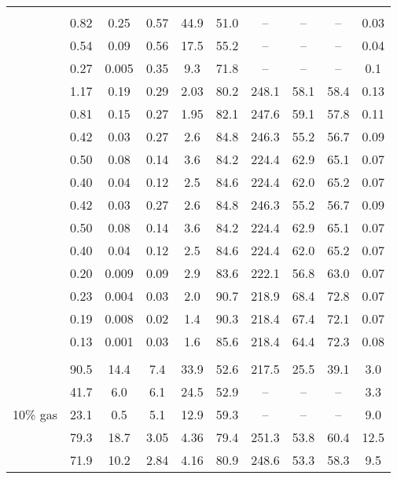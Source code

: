 \documentclass{article}
\begin{document}
\begin{landscape}
\begin{longtable}{cccccccccc}
\hline\hline\\[-4.0ex] 
\endlastfoot
\multirow{15}{*}{\begin{sideways}{\Large{1\% gas}}\end{sideways}}
& 0.82   &  0.25   & 0.57 & 44.9 & 51.0 & --     &  --  & -- & 0.03\\
& 0.54   &  0.09   & 0.56 & 17.5 & 55.2 & --     &  --  & -- & 0.04\\
& 0.27   &  0.005  & 0.35 & 9.3  & 71.8 & --     &  --  & -- & 0.1\\
& 1.17   &  0.19   & 0.29 & 2.03 & 80.2 & 248.1  & 58.1 & 58.4 & 0.13\\
& 0.81   &  0.15   & 0.27 & 1.95 & 82.1 & 247.6  & 59.1 & 57.8 & 0.11\\
& 0.42   &  0.03   & 0.27 & 2.6  & 84.8 & 246.3  & 55.2 & 56.7 & 0.09\\
& 0.50   &  0.08   & 0.14 & 3.6  & 84.2 & 224.4  & 62.9 & 65.1 & 0.07\\
& 0.40   &  0.04   & 0.12 & 2.5  & 84.6 & 224.4  & 62.0 & 65.2 & 0.07\\
& 0.42   &  0.03   & 0.27 & 2.6  & 84.8 & 246.3  & 55.2 & 56.7 & 0.09\\
& 0.50   &  0.08   & 0.14 & 3.6  & 84.2 & 224.4  & 62.9 & 65.1 & 0.07\\
& 0.40   &  0.04   & 0.12 & 2.5  & 84.6 & 224.4  & 62.0 & 65.2 & 0.07\\
& 0.20   &  0.009  & 0.09 & 2.9  & 83.6 & 222.1  & 56.8 & 63.0 & 0.07\\
& 0.23   &  0.004  & 0.03 & 2.0  & 90.7 & 218.9  & 68.4 & 72.8 & 0.07\\
& 0.19   &  0.008  & 0.02 & 1.4  & 90.3 & 218.4  & 67.4 & 72.1 & 0.07\\
& 0.13   &  0.001  & 0.03 & 1.6  & 85.6 & 218.4  & 64.4 & 72.3 & 0.08\\[0.3ex]\hline\\[0.3ex]
\multirow{15}{*}{\begin{sideways}{\Large{10\% gas}}\end{sideways}}
& 90.5  & 14.4    & 7.4  & 33.9 & 52.6 & 217.5  & 25.5 & 39.1 & 3.0\\
& 41.7  &  6.0    & 6.1  & 24.5 & 52.9 & --     &  --  &  --  & 3.3\\
& 23.1  &  0.5    & 5.1  & 12.9 & 59.3 & --     &  --  &  --  & 9.0\\
& 79.3  &  18.7   & 3.05 & 4.36 & 79.4 & 251.3  & 53.8 & 60.4 & 12.5\\
& 71.9  &  10.2   & 2.84 & 4.16 & 80.9 & 248.6  & 53.3 & 58.3 & 9.5\\

\end{longtable}
\end{landscape}
\end{document}
